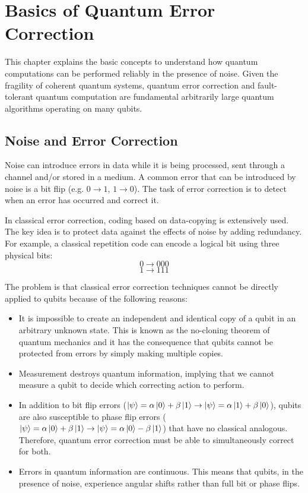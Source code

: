 %
%
\chapter {Basics of Quantum Error Correction}

This chapter explains the basic concepts to understand how quantum computations can be performed reliably in the presence of noise. Given the fragility of coherent quantum systems, quantum error correction and fault-tolerant quantum computation are fundamental arbitrarily large quantum algorithms operating on many qubits.

\section{Noise and Error Correction}

Noise can introduce errors in data while it is being processed, sent through a channel and/or stored in a medium. A common error that can be introduced by noise is a bit flip (e.g. $0 \rightarrow 1$, $1 \rightarrow 0$). The task of error correction is to detect when an error has occurred and correct it.

In classical error correction, coding based on data-copying is extensively used. The key idea is to protect data against the effects of noise by adding redundancy. For example, a classical repetition code can encode a logical bit using three physical bits:
$$0 \rightarrow 000$$
$$1 \rightarrow 111$$

The problem is that classical error correction techniques cannot be directly applied to qubits because of the following reasons:
\begin{itemize}[noitemsep]
    \item It is impossible to create an independent and identical copy of a qubit in an arbitrary unknown state. This is known as the no-cloning theorem of quantum mechanics and it has the consequence that qubits cannot be protected from errors by simply making multiple copies\cite{NoCloningTheorem_1982}.
    \item Measurement destroys quantum information, implying that we cannot measure a qubit to decide which correcting action to perform.
    \item In addition to bit flip errors ($\left|{\psi}\right\rangle=\alpha\left|{0}\right\rangle+\beta\left|{1}\right\rangle \rightarrow \left|{\psi}\right\rangle=\alpha\left|{1}\right\rangle+\beta\left|{0}\right\rangle$), qubits are also susceptible to phase flip errors ($\left|{\psi}\right\rangle=\alpha\left|{0}\right\rangle+\beta\left|{1}\right\rangle \rightarrow \left|{\psi}\right\rangle=\alpha\left|{0}\right\rangle-\beta\left|{1}\right\rangle$) that have no classical analogous. Therefore, quantum error correction must be able to simultaneously correct for both.
    \item Errors in quantum information are continuous. This means that qubits, in the presence of noise, experience angular shifts rather than full bit or phase flips.
\end{itemize}

